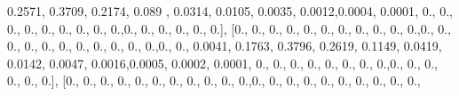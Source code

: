 \documentclass[
]{book}
\newenvironment{Shaded}{\begin{snugshade}}{\end{snugshade}}
\newcommand{\FloatTok}[1]{\textcolor[rgb]{0.00,0.00,0.81}{#1}}
\newcommand{\NormalTok}[1]{#1}
\begin{document}
\begin{Shaded}
\begin{Highlighting}[]
\FloatTok{0.2571}\NormalTok{, }\FloatTok{0.3709}\NormalTok{, }\FloatTok{0.2174}\NormalTok{, }\FloatTok{0.089}\NormalTok{ , }\FloatTok{0.0314}\NormalTok{, }\FloatTok{0.0105}\NormalTok{, }\FloatTok{0.0035}\NormalTok{, }\FloatTok{0.0012}\NormalTok{,}\FloatTok{0.0004}\NormalTok{, }\FloatTok{0.0001}\NormalTok{,}
\FloatTok{0.}\NormalTok{, }\FloatTok{0.}\NormalTok{, }\FloatTok{0.}\NormalTok{, }\FloatTok{0.}\NormalTok{, }\FloatTok{0.}\NormalTok{, }\FloatTok{0.}\NormalTok{, }\FloatTok{0.}\NormalTok{, }\FloatTok{0.}\NormalTok{, }\FloatTok{0.}\NormalTok{,}\FloatTok{0.}\NormalTok{, }\FloatTok{0.}\NormalTok{, }\FloatTok{0.}\NormalTok{, }\FloatTok{0.}\NormalTok{, }\FloatTok{0.}\NormalTok{, }\FloatTok{0.}\NormalTok{], [}\FloatTok{0.}\NormalTok{, }\FloatTok{0.}\NormalTok{, }\FloatTok{0.}\NormalTok{, }\FloatTok{0.}\NormalTok{, }\FloatTok{0.}\NormalTok{,}
\FloatTok{0.}\NormalTok{, }\FloatTok{0.}\NormalTok{, }\FloatTok{0.}\NormalTok{, }\FloatTok{0.}\NormalTok{, }\FloatTok{0.}\NormalTok{, }\FloatTok{0.}\NormalTok{,}\FloatTok{0.}\NormalTok{, }\FloatTok{0.}\NormalTok{, }\FloatTok{0.}\NormalTok{, }\FloatTok{0.}\NormalTok{, }\FloatTok{0.}\NormalTok{, }\FloatTok{0.}\NormalTok{, }\FloatTok{0.}\NormalTok{, }\FloatTok{0.}\NormalTok{, }\FloatTok{0.}\NormalTok{, }\FloatTok{0.}\NormalTok{, }\FloatTok{0.}\NormalTok{,}\FloatTok{0.}\NormalTok{, }\FloatTok{0.}\NormalTok{,}
\FloatTok{0.0041}\NormalTok{, }\FloatTok{0.1763}\NormalTok{, }\FloatTok{0.3796}\NormalTok{, }\FloatTok{0.2619}\NormalTok{, }\FloatTok{0.1149}\NormalTok{, }\FloatTok{0.0419}\NormalTok{, }\FloatTok{0.0142}\NormalTok{, }\FloatTok{0.0047}\NormalTok{, }\FloatTok{0.0016}\NormalTok{,}\FloatTok{0.0005}\NormalTok{,}
\FloatTok{0.0002}\NormalTok{, }\FloatTok{0.0001}\NormalTok{, }\FloatTok{0.}\NormalTok{, }\FloatTok{0.}\NormalTok{, }\FloatTok{0.}\NormalTok{, }\FloatTok{0.}\NormalTok{, }\FloatTok{0.}\NormalTok{, }\FloatTok{0.}\NormalTok{, }\FloatTok{0.}\NormalTok{, }\FloatTok{0.}\NormalTok{,}\FloatTok{0.}\NormalTok{, }\FloatTok{0.}\NormalTok{, }\FloatTok{0.}\NormalTok{, }\FloatTok{0.}\NormalTok{, }\FloatTok{0.}\NormalTok{, }\FloatTok{0.}\NormalTok{], [}\FloatTok{0.}\NormalTok{, }\FloatTok{0.}\NormalTok{,}
\FloatTok{0.}\NormalTok{, }\FloatTok{0.}\NormalTok{, }\FloatTok{0.}\NormalTok{, }\FloatTok{0.}\NormalTok{, }\FloatTok{0.}\NormalTok{, }\FloatTok{0.}\NormalTok{, }\FloatTok{0.}\NormalTok{, }\FloatTok{0.}\NormalTok{, }\FloatTok{0.}\NormalTok{,}\FloatTok{0.}\NormalTok{, }\FloatTok{0.}\NormalTok{, }\FloatTok{0.}\NormalTok{, }\FloatTok{0.}\NormalTok{, }\FloatTok{0.}\NormalTok{, }\FloatTok{0.}\NormalTok{, }\FloatTok{0.}\NormalTok{, }\FloatTok{0.}\NormalTok{, }\FloatTok{0.}\NormalTok{, }\FloatTok{0.}\NormalTok{,}

\end{Highlighting}
\end{Shaded}
\end{document}
